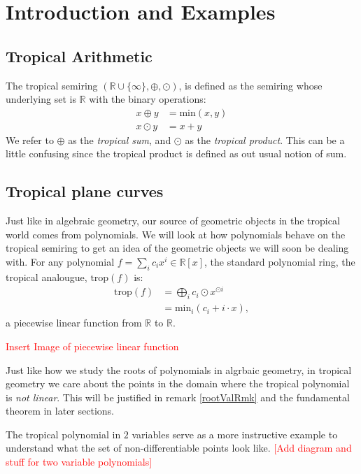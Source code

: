 \section{Introduction and Examples}
\subsection{Tropical Arithmetic}
    \begin{definition} The tropical semiring $(\mathbb{R} \cup \{\infty\}, \oplus, \odot)$, is defined as the semiring whose underlying set is $\mathbb{R}$ with the binary operations: 
        \begin{align*}
            x \oplus y &= \text{min}(x,y)\\
            x \odot y  &= x + y
        \end{align*}
    We refer to $\oplus$ as the \textit{tropical sum}, and $\odot$ as the \textit{tropical product}. This can be a little confusing since the tropical product is defined as out usual notion of sum.
    \end{definition}

\subsection{Tropical plane curves}
Just like in algebraic geometry, our source of geometric objects in the tropical world comes from polynomials.
We will look at how polynomials behave on the tropical semiring to get an idea of the geometric objects we will soon be dealing with.
For any polynomial $f  = \sum_{i}c_{i}x^{i}\in \mathbb{R}[x]$, the standard polynomial ring, the tropical analougue, $\text{trop}(f)$ is:
\begin{align*}
    \text{trop}(f) &= \bigoplus_{i}c_{i}\odot x^{\odot i}\\
                   &= \text{min}_{i}(c_{i} + i \cdot x),
\end{align*}
a piecewise linear function from $\mathbb{R}$ to $\mathbb{R}$.
\par \textcolor{red}{Insert Image of piecewise linear function}
\par Just like how we study the roots of polynomials in algrbaic geometry, in tropical geometry we care about the points in the domain where the tropical polynomial is \textit{not linear}.
This will be justified in remark \ref{rootValRmk} and the fundamental theorem in later sections.
\par The tropical polynomial in $2$ variables serve as a more instructive example to understand what the set of non-differentiable points look like. 
\textcolor{red}{[Add diagram and stuff for two variable polynomials]}

